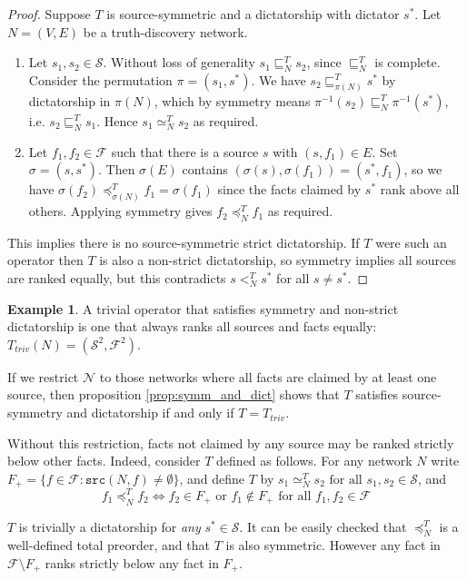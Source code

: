 \documentclass{article}
\theoremstyle{definition} \newtheorem{definition}{Definition}
\theoremstyle{definition} \newtheorem{example}{Example}
\theoremstyle{plain} \newtheorem{axiom}{Axiom}
\theoremstyle{plain} \newtheorem*{remark}{Remark}
\theoremstyle{remark} \newtheorem*{notation}{Notation}
\theoremstyle{plain} \newtheorem{lemma}{Lemma}
\theoremstyle{plain} \newtheorem{proposition}{Proposition}
\renewcommand{\S}{\mathcal{S}}  %
\newcommand{\F}{\mathcal{F}}
\newcommand{\sle}{\sqsubseteq}
\newcommand{\slt}{<}
\newcommand{\seq}{\simeq}
\newcommand{\fle}{\preceq}
\newcommand{\src}{\texttt{src}}
\begin{document}
\begin{proof}
Suppose $T$ is source-symmetric and a dictatorship with dictator $s^*$. Let
$N=(V,E)$ be a truth-discovery network.
\begin{enumerate}
\item
    Let $s_1, s_2 \in \S$. Without loss of generality $s_1 \sle_N^T s_2$, since
    $\sle_N^T$ is complete. Consider the permutation $\pi=(s_1, s^*)$.  We have
    $s_2 \sle_{\pi(N)}^T s^*$ by dictatorship in $\pi(N)$, which by symmetry
    means $\pi^{-1}(s_2) \sle_N^T \pi^{-1}(s^*)$, i.e. $s_2 \sle_N^T s_1$.
    Hence $s_1 \seq_N^T s_2$ as required.

\item
    Let $f_1, f_2 \in \F$ such that there is a source $s$ with $(s, f_1) \in E$.
    Set $\sigma=(s, s^*)$. Then $\sigma(E)$ contains $(\sigma(s), \sigma(f_1))
    = (s^*, f_1)$, so we have $\sigma(f_2) \fle_{\sigma(N)}^T f_1 =
    \sigma(f_1)$ since the facts claimed by $s^*$ rank above all others.
    Applying symmetry gives $f_2 \fle_N^T f_1$ as required.
\end{enumerate}

This implies there is no source-symmetric strict dictatorship. If $T$ were such
an operator then $T$ is also a non-strict dictatorship, so symmetry implies
all sources are ranked equally, but this contradicts $s \slt_N^T s^*$ for all
$s \ne s^*$.

\end{proof}

\begin{example}
A trivial operator that satisfies symmetry and non-strict dictatorship is one
that always ranks all sources and facts equally: $T_{triv}(N) = (\S^2, \F^2)$.

If we restrict $\mathcal{N}$ to those networks where all facts are claimed by
at least one source, then proposition \ref{prop:symm_and_dict} shows that $T$
satisfies source-symmetry and dictatorship if and only if $T=T_{triv}$.

Without this restriction, facts not claimed by any source may be ranked
strictly below other facts. Indeed, consider $T$ defined as follows. For any
network $N$ write $F_{+} = \{f \in \F : \src(N, f) \ne \emptyset \}$, and
define $T$ by $s_1 \seq_N^{T} s_2 \text{ for all } s_1, s_2 \in \S$, and
$$
    f_1 \fle_N^{T} f_2 \iff f_2 \in F_{+} \text{ or } f_1 \notin F_{+}
    \text{ for all } f_1, f_2 \in \F
$$

$T$ is trivially a dictatorship for \emph{any} $s^* \in \S$. It can be easily
checked that $\fle_N^T$ is a well-defined total preorder, and that $T$ is also
symmetric. However any fact in $\F \setminus F_+$ ranks strictly below any fact
in $F_+$.
\end{example}
\end{document}
